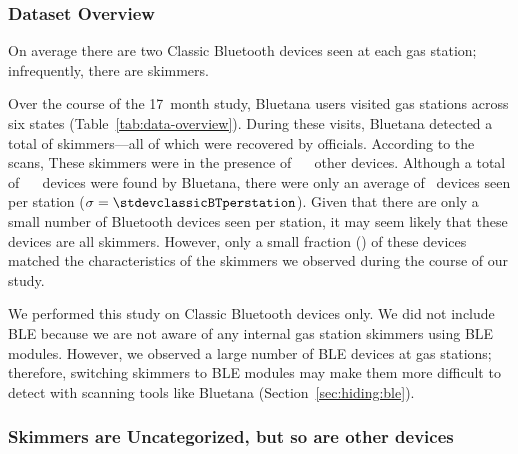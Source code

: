 \subsubsection*{Dataset Overview} %

\begin{table}
    \centering
    
    \caption{On average there are two Classic Bluetooth devices seen at each gas
    station; infrequently, there are skimmers.
    }
    \label{tab:data-overview}
\end{table}

Over the course of the 17~month study, Bluetana users visited \visitedgasstations\xspace gas
stations across six states (Table~\ref{tab:data-overview}).
%
During these visits, Bluetana detected a total of \totalskimmersfirstvisit\xspace skimmers---all of which were recovered by officials.
%
According to the scans, These skimmers were in the presence of ~\totalbtobserved~ other devices.
% 
Although a total of ~\totalbtobserved~ devices were found by Bluetana,
there were only an average of \averageclassicBTperstation~devices seen per
station ($\sigma = \stdevclassicBTperstation$).
%
Given that there are only a small number of Bluetooth devices seen per station,
it may seem likely that these devices are all skimmers.
%
However, only a small fraction (\pctmatchskimmer) of these devices matched the
characteristics of the skimmers we observed during the course of our study. 
%

%
We performed this study on Classic Bluetooth devices only.
%
We did not include BLE because we are not
aware of any internal gas station skimmers using BLE modules.
%
However, we observed a large number of BLE devices at gas stations; therefore, switching skimmers to
BLE modules may make them more difficult to detect with
scanning tools like Bluetana (Section~\ref{sec:hiding:ble}).





\subsubsection*{Skimmers are Uncategorized, but so are other devices} %

